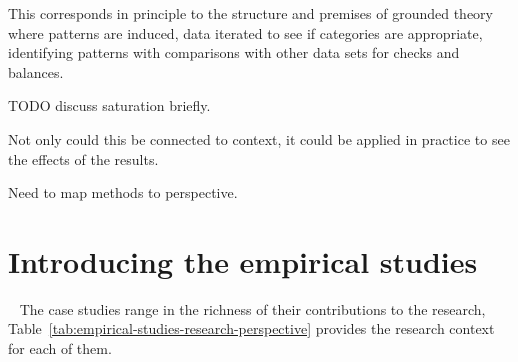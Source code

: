 This corresponds in principle to the structure and premises of grounded theory where patterns are induced, data iterated to see if categories are appropriate, identifying patterns with comparisons with other data sets for checks and balances. 

TODO discuss saturation briefly. 

Not only could this be connected to context, it could be applied in practice to see the effects of the results.

Need to map methods to perspective. 



\section{Introducing the empirical studies}~\label{section-introducing-the-case-studies}
The case studies range in the richness of their contributions to the research, Table~\ref{tab:empirical-studies-research-perspective} provides the research context for each of them. 

